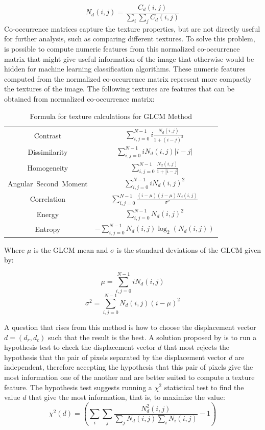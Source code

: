 \begin{equation}
\label{eq:normalized}
    N_d(i,j) = \frac{C_d(i,j)}{\sum_i\sum_j C_d(i,j)}
\end{equation}
Co-occurrence matrices capture the texture properties, but are not directly useful for further analysis, such as comparing different textures. To solve this problem, is possible to compute numeric features from this normalized co-occurrence matrix that might give useful information of the image that otherwise would be hidden for machine learning classification algorithms. These numeric features computed from the normalized co-occurrence matrix represent more compactly the textures of the image.
The following textures are features that can be obtained from normalized co-occurrence matrix:
\begin{table}[H]
\centering
\begin{tabular}{ |c |c |}
 \hline
 Contrast & $\sum_{i,j=0}^{N-1} i\frac{N_d(i,j)}{1+(i-j)^2}$\\ 
 Dissimilarity & $\sum_{i,j=0}^{N-1} i N_d(i,j)|i-j|$\\
 Homogeneity & $\sum_{i,j=0}^{N-1}\frac{N_d(i,j)}{1+|i-j|}$\\
 Angular\ Second\ Moment & $\sum_{i,j=0}^{N-1} i N_d(i,j)^2$\\
 Correlation & $\sum_{i,j=0}^{N-1}\frac{(i-\mu)(j-\mu)N_d(i,j)}{\sigma^2}$\\
 Energy & $\sum_{i,j=0}^{N-1}N_d(i,j)^2$\\
 Entropy & $ -\sum_{i,j=0}^{N-1}N_d(i,j)\log_2(N_d(i,j))$\\
 \hline
\end{tabular}
\caption{Formula for texture calculations for GLCM Method}
\label{table:glcm_calculations}
\end{table}

Where $\mu$ is the GLCM mean and $\sigma$ is the standard deviations of the GLCM given by:

\begin{equation}
    \mu=\sum_{i,j=0}^{N-1}iN_d(i,j)
\end{equation}
\begin{equation}
    \sigma^2=\sum_{i,j=0}^{N-1}N_d(i,j)(i-\mu)^2
\end{equation}

A question that rises from this method is how to choose the displacement vector $d=(d_r,d_c)$ such that the result is the best. A solution proposed by  \cite{Zucker} is to run a hypothesis test to check the displacement vector $d$ that most rejects the hypothesis that the pair of pixels separated by the displacement vector $d$ are independent, therefore accepting the hypothesis that this pair of pixels give the most information one of the another and are better suited to compute a texture feature.
The hypothesis test suggests running a $\chi^2$ statistical test to find the value $d$ that give the most information, that is, to maximize the value:
\begin{equation}
    \chi^2(d) = (\sum_i\sum_j \frac{N_d^2(i,j)}{\sum_jN_d(i,j)\sum_iN_i(i,j)} -1)
\end{equation}

